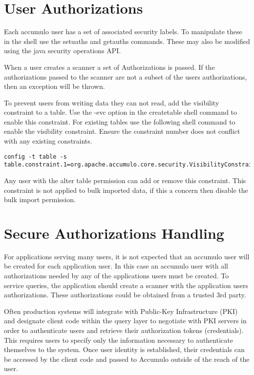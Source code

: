 \section{User Authorizations}

Each accumulo user has a set of associated security labels.  To manipulate
these in the shell use the setuaths and getauths commands.  These may also be
modified using the java security operations API.   

When a user creates a scanner a set of Authorizations is passed.  If the
authorizations passed to the scanner are not a subset of the users
authorizations, then an exception will be thrown.

To prevent users from writing data they can not read, add the visibility
constraint to a table.  Use the -evc option in the createtable shell command to
enable this constraint.  For existing tables use the following shell command to
enable the visibility constraint.  Ensure the constraint number does not
conflict with any existing constraints.
  
\small
\begin{verbatim}
config -t table -s table.constraint.1=org.apache.accumulo.core.security.VisibilityConstraint
\end{verbatim}
\normalsize

Any user with the alter table permission can add or remove this constraint.
This constraint is not applied to bulk imported data, if this a concern then
disable the bulk import permission.

\section{Secure Authorizations Handling}

For applications serving many users, it is not expected that an accumulo user
will be created for each application user.  In this case an accumulo user with
all authorizations needed by any of the applications users must be created.  To
service queries, the application should create a scanner with the application
users authorizations.  These authorizations could be obtained from a trusted 3rd
party.

Often production systems will integrate with Public-Key Infrastructure (PKI) and
designate client code within the query layer to negotiate with PKI servers in order
to authenticate users and retrieve their authorization tokens (credentials). This
requires users to specify only the information necessary to authenticate themselves
to the system. Once user identity is established, their credentials can be accessed by
the client code and passed to Accumulo outside of the reach of the user.

